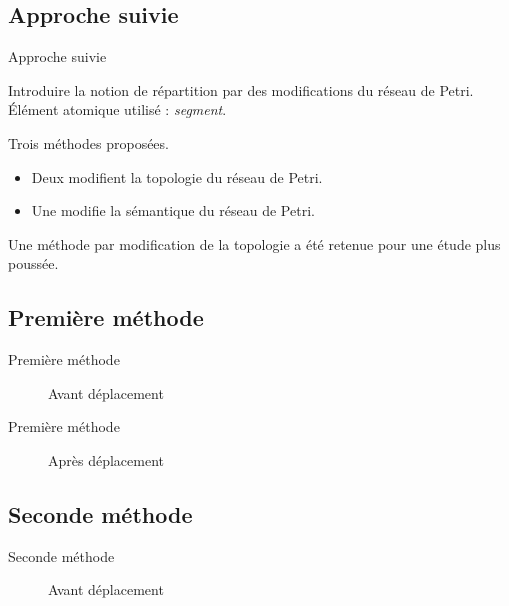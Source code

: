 \subsection{Approche suivie}
\begin{frame}{Approche suivie}
	\begin{itemize}
		\itemar Introduire la notion de répartition par des modifications du réseau de Petri.
		\itemar Élément atomique utilisé : \textit{segment}.
	\end{itemize}
	\vspace{1em}
	Trois méthodes proposées.
	\begin{itemize}
		\item Deux modifient la topologie du réseau de Petri.
		\item Une modifie la sémantique du réseau de Petri.
	\end{itemize}
	
	Une méthode par modification de la topologie a été retenue pour une étude plus poussée.
\end{frame}
\subsection{Première méthode}
\begin{frame}{Première méthode}
	\begin{figure}[h!]
		\centering
		
		\caption{Avant déplacement}
		\label{fig:deplacementMethode1}
	\end{figure}
\end{frame}

\begin{frame}{Première méthode}
	\begin{figure}[h!]
		\centering
		
		\caption{Après déplacement}
		\label{fig:deplacementMethode1-2}
	\end{figure}
\end{frame}

\subsection{Seconde méthode}
\begin{frame}{Seconde méthode}
	\begin{figure}[h!]
		\centering
		
		\caption{Avant déplacement}
		\label{fig:deplacementMethode2}
	\end{figure}
\end{frame}

